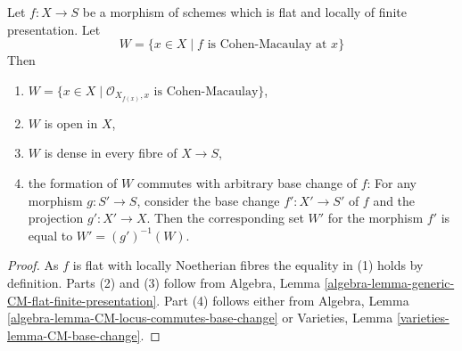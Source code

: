 \begin{lemma}
\label{lemma-flat-finite-presentation-CM-open}
\begin{reference}
\cite[IV Corollary 12.1.7(iii)]{EGA}
\end{reference}
Let $f : X \to S$ be a morphism of schemes which is flat and locally
of finite presentation. Let
$$
W = \{x \in X \mid f\text{ is Cohen-Macaulay at }x\}
$$
Then
\begin{enumerate}
\item $W = \{x \in X \mid \mathcal{O}_{X_{f(x)}, x}\text{ is Cohen-Macaulay}\}$,
\item $W$ is open in $X$,
\item $W$ is dense in every fibre of $X \to S$,
\item the formation of $W$ commutes with arbitrary base change of $f$:
For any morphism $g : S' \to S$, consider
the base change $f' : X' \to S'$ of $f$ and the
projection $g' : X' \to X$. Then the corresponding
set $W'$ for the morphism $f'$ is equal to $W' = (g')^{-1}(W)$.
\end{enumerate}
\end{lemma}

\begin{proof}
As $f$ is flat with locally Noetherian fibres the equality in (1) holds
by definition. Parts (2) and (3) follow from
Algebra, Lemma \ref{algebra-lemma-generic-CM-flat-finite-presentation}.
Part (4) follows either from
Algebra, Lemma \ref{algebra-lemma-CM-locus-commutes-base-change}
or
Varieties, Lemma \ref{varieties-lemma-CM-base-change}.
\end{proof}

